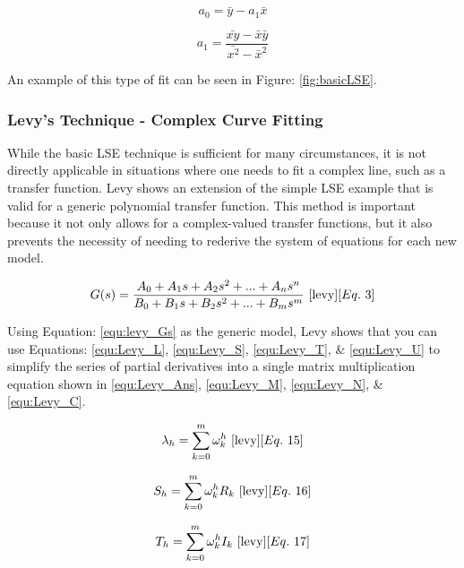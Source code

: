 \begin{equation}
    \label{equ:LSE_solc}
    a_0 = \bar{y} - a_1 \bar{x}
\end{equation}

\begin{equation}
    \label{equ:LSE_sold}
    a_1 = \frac{\bar{xy} - \bar{x}\bar{y}}{\bar{x^2} - \bar{x}^2}
\end{equation}

An example of this type of fit can be seen in Figure: \ref{fig:basicLSE}.


\subsubsection{Levy's Technique - Complex Curve Fitting}
While the basic LSE technique is sufficient for many circumstances, it is not directly applicable in situations where one needs to fit a complex line, such as a transfer function. Levy \cite{levy} shows an extension of the simple LSE example that is valid for a generic polynomial transfer function. This method is important because it not only allows for a complex-valued transfer functions, but it also prevents the necessity of needing to rederive the system of equations for each new model. 

\begin{equation}
    \label{equ:levy_Gs}
    G(s) = \frac{A_0 + A_1 s + A_2 s^2 + ... + A_n s^n}{B_0 + B_1 s + B_2 s^2 + ... + B_m s^m}
    ~\cite{levy}[Eq.~3]
\end{equation}

Using Equation: \eqref{equ:levy_Gs} as the generic model, Levy shows that you can use Equations: \eqref{equ:Levy_L}, \eqref{equ:Levy_S}, \eqref{equ:Levy_T}, \& \eqref{equ:Levy_U} to simplify the series of partial derivatives into a single matrix multiplication equation shown in \eqref{equ:Levy_Ans}, \eqref{equ:Levy_M}, \eqref{equ:Levy_N}, \& \eqref{equ:Levy_C}.

\begin{equation}
    \label{equ:Levy_L}
    \lambda _h = \sum_{k=0}^{m} \omega _k ^h
    ~\cite{levy}[Eq.~15]
\end{equation}

\begin{equation}
    \label{equ:Levy_S}
    S_h = \sum_{k=0}^{m} \omega _k ^h R_k
    ~\cite{levy}[Eq.~16]
\end{equation}

\begin{equation}
    \label{equ:Levy_T}
    T_h = \sum_{k=0}^{m} \omega _k ^h I_k
    ~\cite{levy}[Eq.~17]
\end{equation}

